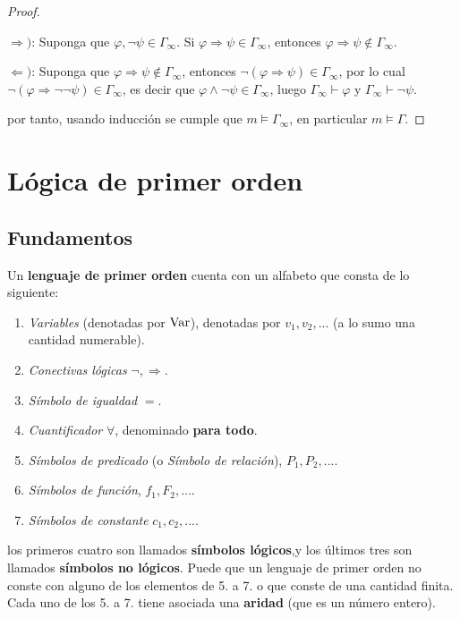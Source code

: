 \documentclass[12pt]{report}
\theoremstyle{largebreak}
\begin{document}
\begin{proof}
\begin{enumerate}
            $\Rightarrow)$: Suponga que $\varphi,\neg\psi\in\Gamma_\infty$. Si $\varphi\Rightarrow\psi\in\Gamma_\infty$, entonces $\varphi\Rightarrow\psi\notin\Gamma_\infty$.

            $\Leftarrow)$: Suponga que $\varphi\Rightarrow\psi\notin\Gamma_\infty$, entonces $\neg(\varphi\Rightarrow\psi)\in\Gamma_\infty$, por lo cual $\neg(\varphi\Rightarrow\neg\neg \psi)\in\Gamma_\infty$, es decir que $\varphi\land\neg\psi\in\Gamma_\infty$, luego $\Gamma_\infty\vdash\varphi$ y $\Gamma_\infty\vdash\neg\psi$.
        \end{enumerate}
        por tanto, usando inducción se cumple que $m\vDash\Gamma_\infty$, en particular $m\vDash\Gamma$.
    \end{proof}

    \chapter{Lógica de primer orden}

    \section{Fundamentos}

    \begin{mydef}
        Un \textbf{lenguaje de primer orden} cuenta con un alfabeto que consta de lo siguiente:
        \begin{enumerate}
            \item \textit{Variables} (denotadas por $\textup{Var}$), denotadas por $v_1,v_2,...$ (a lo sumo una cantidad numerable).
            \item \textit{Conectivas lógicas} $\neg,\Rightarrow$.
            \item \textit{Símbolo de igualdad} $=$.
            \item \textit{Cuantificador} $\forall$, denominado \textbf{para todo}.
            \item \textit{Símbolos de predicado} (o \textit{Símbolo de relación}), $P_1,P_2,...$.
            \item \textit{Símbolos de función}, $f_1,F_2,...$.
            \item \textit{Símbolos de constante} $c_1,c_2,...$.
        \end{enumerate}
        los primeros cuatro son llamados \textbf{símbolos lógicos},y los últimos tres son llamados \textbf{símbolos no lógicos}. Puede que un lenguaje de primer orden no conste con alguno de los elementos de 5. a 7. o que conste de una cantidad finita. Cada uno de los 5. a 7. tiene asociada una \textbf{aridad} (que es un número entero).
    \end{mydef}
\end{document}
